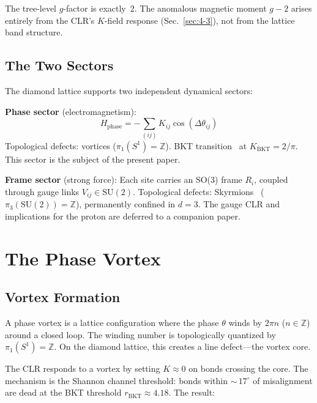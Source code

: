 \documentclass[aps,prd,onecolumn,superscriptaddress,floatfix,12pt]{revtex4-2}
\newcommand{\KBKT}{K_{\text{BKT}}}
\begin{document}
The tree-level $g$-factor is exactly~2. The anomalous magnetic moment $g - 2$ arises entirely from the CLR's $K$-field response (Sec.~\ref{sec:4-3}), not from the lattice band structure.

\subsection{The Two Sectors}\label{sec:3-4}

The diamond lattice supports two independent dynamical sectors:

\textbf{Phase sector} (electromagnetism):
\begin{equation}
H_{\text{phase}} = -\sum_{(ij)} K_{ij}\cos(\Delta\theta_{ij})
\end{equation}
Topological defects: vortices ($\pi_1(S^1) = \mathbb{Z}$). BKT transition~\cite{Berezinskii1971,Kosterlitz1973} at $\KBKT = 2/\pi$. This sector is the subject of the present paper.

\textbf{Frame sector} (strong force): Each site carries an SO(3) frame $R_i$, coupled through gauge links $V_{ij} \in \text{SU}(2)$. Topological defects: Skyrmions~\cite{Skyrme1962} ($\pi_3(\text{SU}(2)) = \mathbb{Z}$), permanently confined in $d = 3$. The gauge CLR and implications for the proton are deferred to a companion paper.

\section{The Phase Vortex}\label{sec:4}

\subsection{Vortex Formation}\label{sec:4-1}

A phase vortex is a lattice configuration where the phase $\theta$ winds by $2\pi n$ ($n \in \mathbb{Z}$) around a closed loop. The winding number is topologically quantized by $\pi_1(S^1) = \mathbb{Z}$. On the diamond lattice, this creates a line defect---the vortex core.

The CLR responds to a vortex by setting $K \approx 0$ on bonds crossing the core. The mechanism is the Shannon channel threshold: bonds within ${\sim}\,17^\circ$ of misalignment are dead at the BKT threshold $r_{\text{BKT}} \approx 4.18$. The result:
\end{document}
